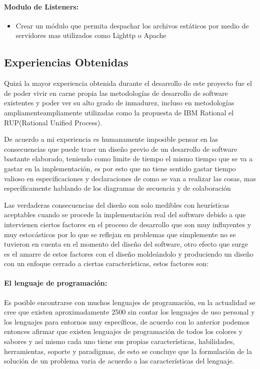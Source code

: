 \paragraph{Modulo de Listeners:}

\begin{itemize}
	\item Crear un módulo que permita despachar los archivos estáticos por medio de servidores mas utilizados como Lighttp \cite{lighttp} o Apache \cite{apache}
\end{itemize}


\subsection{Experiencias Obtenidas}

Quizá la mayor experiencia obtenida durante el desarrollo de este proyecto fue el de poder vivir en carne propia las metodologías de desarrollo de software existentes y poder ver su alto grado de inmadurez, incluso en metodologías ampliamenteampliamente utilizadas como la propuesta de IBM Rational el RUP(Rational Unified Process).

De acuerdo a mi experiencia es humanamente imposible pensar en las consecuencias que puede traer un diseño previo de un desarrollo de software bastante elaborado, teniendo como limite de tiempo el mismo tiempo que se va a gastar en la implementación, es por esto que no tiene sentido gastar tiempo valioso en especificaciones y declaraciones de como se van a realizar las cosas, mas específicamente hablando de los diagramas de secuencia y de colaboración

Las verdaderas consecuencias del diseño son solo medibles con heurísticas aceptables cuando se procede la implementación real del software debido a que intervienen ciertos factores en el proceso de desarrollo que son muy influyentes y muy estocásticos por lo que se reflejan en problemas que simplemente no se tuvieron en cuenta en el momento del diseño del software, otro efecto que surge es el amarre de estos factores con el diseño moldeándolo y produciendo un diseño con un enfoque cerrado a ciertas características, estos factores son:

\paragraph{El lenguaje de programación:}
Es posible encontrarse con muchos lenguajes de programación, en la actualidad se cree que existen aproximadamente 2500 \cite{bd_lenguajes_programación} sin contar los lenguajes de uso personal y los lenguajes para entornos muy específicos, de acuerdo con lo anterior podemos entonces afirmar que existen lenguajes de programación de todos los colores y sabores y así mismo cada uno tiene sus propias características, habilidades, herramientas, soporte y paradigmas, de esto se concluye que la formulación de la solución de un problema varia de acuerdo a las características del lenguaje.


